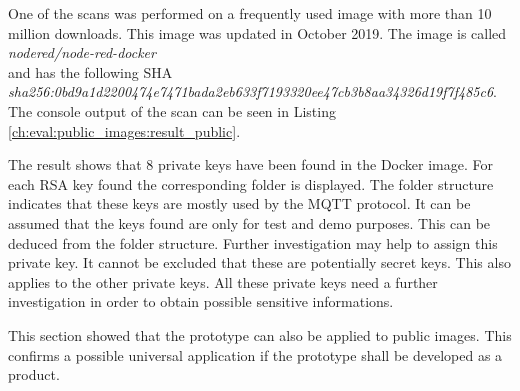 One of the scans was performed on a frequently used image with more than 10 million downloads.
This image was updated in October 2019. 
The image is called \textit{nodered/node-red-docker} \\and has the following SHA \\\textit{sha256:0bd9a1d2200474e7471bada2eb633f7193320ee47cb3b8aa34326d19f7f485c6}.
\\The console output of the scan can be seen in Listing \ref{ch:eval:public_images:result_public}.

The result shows that 8 private keys have been found in the Docker image.
For each RSA key found the corresponding folder is displayed.
The folder structure indicates that these keys are mostly used by the MQTT protocol.
It can be assumed that the keys found are only for test and demo purposes. This can be deduced from the folder structure.
Further investigation may help to assign this private key. 
It cannot be excluded that these are potentially secret keys.
This also applies to the other private keys.
All these private keys need a further investigation in order to obtain possible sensitive informations.

This section showed that the prototype can also be applied to public images.
This confirms a possible universal application if the prototype shall be developed as a product. 
